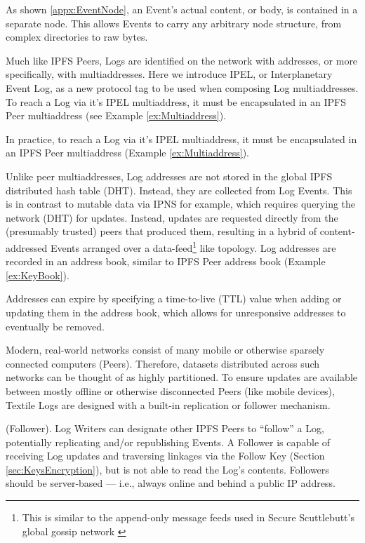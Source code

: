 \documentclass{textile}
\begin{document}
As shown \ref{appx:EventNode}, an Event's actual content, or body, is contained in a separate node. This allows Events to carry any arbitrary node structure, from complex directories to raw bytes.

Much like IPFS Peers, Logs are identified on the network with addresses, or more specifically, with multiaddresses\cite{multiformatsMultiaddr}. Here we introduce IPEL, or Interplanetary Event Log, as a new protocol tag to be used when composing Log multiaddresses. To reach a Log via it's IPEL multiaddress, it must be encapsulated in an IPFS Peer multiaddress (see Example \ref{ex:Multiaddress}).

In practice, to reach a Log via it's IPEL multiaddress, it must be encapsulated in an IPFS Peer multiaddress (Example \ref{ex:Multiaddress}).

Unlike peer multiaddresses, Log addresses are not stored in the global IPFS distributed hash table \cite{benetIPFSContentAddressed2014} (DHT). Instead, they are collected from Log Events. This is in contrast to mutable data via IPNS for example, which requires querying the network (DHT) for updates. Instead, updates are requested directly from the (presumably trusted) peers that produced them, resulting in a hybrid of content-addressed Events arranged over a data-feed\footnote{This is similar to the append-only message feeds used in Secure Scuttlebutt’s global gossip network \cite{securescuttlebuttScuttlebuttProtocolGuide}} like topology. Log addresses are recorded in an address book, similar to IPFS Peer address book (Example \ref{ex:KeyBook}).

Addresses can expire by specifying a time-to-live (TTL) value when adding or updating them in the address book, which allows for unresponsive addresses to eventually be removed.

Modern, real-world networks consist of many mobile or otherwise sparsely connected computers (Peers). Therefore, datasets distributed across such networks can be thought of as highly partitioned. To ensure updates are available between mostly offline or otherwise disconnected Peers (like mobile devices), Textile Logs are designed with a built-in replication or follower mechanism.

\begin{definition} (Follower). Log Writers can designate other IPFS Peers to ``follow'' a Log, potentially replicating and/or republishing Events. A Follower is capable of receiving Log updates and traversing linkages via the Follow Key (Section  \ref{sec:KeysEncryption}), but is not able to read the Log's contents. Followers should be server-based --- i.e., always online and behind a public IP address.\end{definition}
\end{document}
